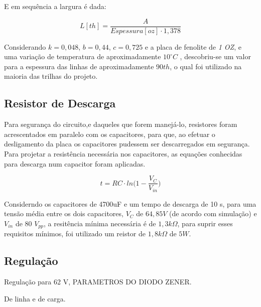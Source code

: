 \documentclass[a4paper,12pt,oneside,openany,table,xcdraw]{article}
\begin{document}
E em sequência a largura é dada:

\begin{equation}
L [\mathit{th}] = \dfrac{A}{Espessura [oz] \cdot 1,378}
 \end{equation}
\vspace{0.3cm}

Considerando  $k = 0,048$, $b = 0,44$, $c = 0,725$ e a placa de fenolite de \emph{1 OZ}, e uma variação de temperatura de aproximadamente $10^{\circ}C$ , descobriu-se um valor para a espessura das linhas de aproximadamente $90 th$, o qual foi utilizado na maioria das trilhas do projeto.


\subsection{Resistor de Descarga} \label{descarga}

Para segurança do circuito,e daqueles que forem manejá-lo, resistores foram acrescentados em paralelo com os capacitores, para que, ao efetuar o desligamento da placa os capacitores pudessem ser descarregados em segurança.
Para projetar a resistência necessária nos capacitores, as equações conhecidas para descarga num capacitor foram aplicadas.

\begin{equation}
t= RC \cdot ln\bigg( 1 - \frac{V_{C}}{V_{in}} \bigg) 
\end{equation}

Considerndo os capacitores de 4700uF e um tempo de descarga de 10 s, para uma tensão média entre os dois capacitores, $V_{C}$ de $64,85 V$ (de acordo com simulação) e $V_{in}$ de 80 $V_{pp}$, a resitência mínima necessária é de $1,3 k\Omega$, para suprir esses requisitos mínimos, foi utilizado um reistor de $1,8 k\Omega$ de $5W$. 


\subsection{Regulação}

Regulação para 62 V, PARAMETROS DO DIODO ZENER.

De linha e de carga.
\end{document}
